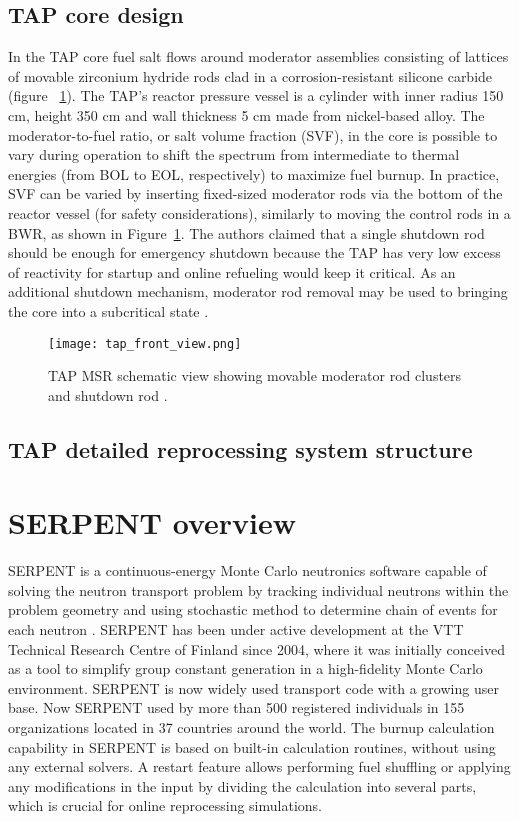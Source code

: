 \subsection{TAP core design}
In the \gls{TAP} core fuel salt flows around moderator assemblies consisting of lattices of 
movable zirconium hydride rods clad in a corrosion-resistant silicone carbide (figure~
\ref{fig:tap-main-view}). The \gls{TAP}'s reactor pressure vessel is a cylinder with inner 
radius 150 cm, 
height 350 cm and wall thickness 5 cm made from nickel-based alloy. The moderator-to-fuel 
ratio, or salt volume fraction (SVF), in the core is possible to vary during operation to 
shift the spectrum from intermediate to thermal energies (from \gls{BOL} to \gls{EOL}, 
respectively) to maximize fuel burnup. In practice, SVF can be varied by inserting 
fixed-sized moderator rods via the bottom of the reactor vessel (for safety considerations), 
similarly to moving the control rods in a \gls{BWR}, as shown in Figure~\ref{fig:tap-main-view}. 
The authors claimed that a single shutdown rod should be enough for emergency shutdown because 
the \gls{TAP} has very low excess of reactivity for startup and online refueling would keep it 
critical. As an additional shutdown mechanism, moderator rod removal may be used to bringing 
the core into a subcritical state \cite{transatomic_power_corporation_neutronics_2016}.
\begin{figure}[ht!]
  \centering
    \hspace{+1.5in}
        \texttt{[image: tap\_front\_view.png]}
    \caption{\gls{TAP} \gls{MSR} schematic view showing movable moderator rod clusters and shutdown rod \cite{transatomic_power_corporation_technical_2016}.}
    \label{fig:tap-main-view}
\end{figure}
\subsection{TAP detailed reprocessing system structure}

\section{SERPENT overview}
SERPENT is a continuous-energy Monte Carlo neutronics software capable of solving the neutron transport problem by tracking individual neutrons within the problem geometry and using stochastic method to determine chain of events for each neutron \cite{leppanen_serpent_2015}. SERPENT has been under active development at the VTT Technical Research Centre of Finland since 2004, where it was initially conceived as a tool to simplify group constant generation in a high-fidelity Monte Carlo environment. SERPENT is now widely used transport code  with a growing user base. Now SERPENT used by more than 500 registered individuals in 155 organizations located in 37 countries around the world. The burnup calculation capability in SERPENT is based on built-in calculation routines, without using any external solvers. A restart feature allows performing fuel shuffling or applying any modifications in the input by dividing the calculation into several parts, which is crucial for online reprocessing simulations.

